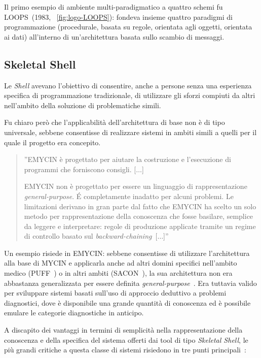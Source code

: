 Il primo esempio di ambiente multi-paradigmatico a quattro schemi fu LOOPS~(1983, \figurename~\ref{fig:logo-LOOPS}): fondeva insieme quattro paradigmi di programmazione (procedurale, basata su regole, orientata agli oggetti, orientata ai dati) all'interno di un'architettura basata sullo scambio di messaggi.~\cite{loops1983aaai}

\subsection{Skeletal Shell}
Le \emph{Shell} avevano l'obiettivo di consentire, anche a persone senza una esperienza specifica di programmazione tradizionale, di utilizzare gli sforzi compiuti da altri nell'ambito della soluzione di problematiche simili.

Fu chiaro però che l'applicabilità dell'architettura di base non è di tipo universale, sebbene consentisse di realizzare sistemi in ambiti simili a quelli per il quale il progetto era concepito.

\begin{quotation}
''EMYCIN è progettato per aiutare la costruzione e l'esecuzione di programmi che forniscono consigli. [$\dots$]

EMYCIN non è progettato per essere un linguaggio di rappresentazione \emph{general-purpose}. \'E completamente inadatto per alcuni problemi. Le limitazioni derivano in gran parte dal fatto che EMYCIN ha scelto un solo metodo per rappresentazione della conoscenza che fosse basilare, semplice da leggere e interpretare: regole di produzione applicate tramite un regime di controllo basato sul \emph{backward-chaining}~[$\dots$]''~\cite{puff1982}
\end{quotation}

Un esempio risiede in EMYCIN: sebbene consentisse di utilizzare l'architettura alla base di MYCIN e applicarla anche ad altri domini specifici nell'ambito medico (PUFF~\cite{puff1982}) o in altri ambiti (SACON~\cite{bennett1979}), la sua architettura non era abbastanza generalizzata per essere definita \emph{general-purpose}~\cite{vanmelle1984}. Era tuttavia valido per sviluppare sistemi basati sull'uso di approccio deduttivo a problemi diagnostici, dove è disponibile una grande quantità di conoscenza ed è possibile emulare le categorie diagnostiche in anticipo.

A discapito dei vantaggi in termini di semplicità nella rappresentazione della conoscenza e della specifica del sistema offerti dai tool di tipo \emph{Skeletal Shell}, le più grandi critiche a questa classe di sistemi risiedono in tre punti principali~\cite{Aikins1983163}:

